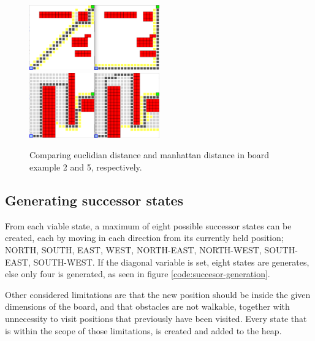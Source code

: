 \begin{figure}[h!]
	\centering
	\begin{minipage}{\textwidth}
		\includegraphics[width=0.5\textwidth]{module_1/images/run_ex2}
		\includegraphics[width=0.5\textwidth]{module_1/images/run_ex5}
	\end{minipage}
	\caption{Comparing euclidian distance and manhattan distance in board example 2 and 5, respectively.}
	\label{run:examples}
\end{figure}

\subsection{Generating successor states}
From each viable state, a maximum of eight possible successor states can be created, each by moving in each direction from its currently held position; NORTH, SOUTH, EAST, WEST, NORTH-EAST, NORTH-WEST, SOUTH-EAST, SOUTH-WEST. If the diagonal variable is set, eight states are generates, else only four is generated, as seen in figure \ref{code:succesor-generation}.

Other considered limitations are that the new position should be inside the given dimensions of the board, and that obstacles are not walkable, together with unnecessity to visit positions that previously have been visited. Every state that is within the scope of those limitations, is created and added to the heap. 



